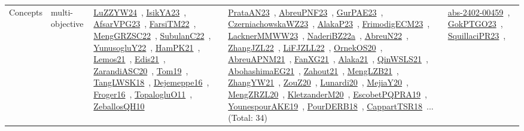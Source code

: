 {\begin{longtable}{lp{3cm}>{\raggedright\arraybackslash}p{6cm}>{\raggedright\arraybackslash}p{6cm}>{\raggedright\arraybackslash}p{8cm}}
\index{multi-objective}\index{Concepts!multi-objective}Concepts & multi-objective & \href{../works/LuZZYW24.pdf}{LuZZYW24}~\cite{LuZZYW24}, \href{../works/IsikYA23.pdf}{IsikYA23}~\cite{IsikYA23}, \href{../works/AfsarVPG23.pdf}{AfsarVPG23}~\cite{AfsarVPG23}, \href{../works/FarsiTM22.pdf}{FarsiTM22}~\cite{FarsiTM22}, \href{../works/MengGRZSC22.pdf}{MengGRZSC22}~\cite{MengGRZSC22}, \href{../works/SubulanC22.pdf}{SubulanC22}~\cite{SubulanC22}, \href{../works/YunusogluY22.pdf}{YunusogluY22}~\cite{YunusogluY22}, \href{../works/HamPK21.pdf}{HamPK21}~\cite{HamPK21}, \href{../works/Lemos21.pdf}{Lemos21}~\cite{Lemos21}, \href{../works/Edis21.pdf}{Edis21}~\cite{Edis21}, \href{../works/ZarandiASC20.pdf}{ZarandiASC20}~\cite{ZarandiASC20}, \href{../works/Tom19.pdf}{Tom19}~\cite{Tom19}, \href{../works/TangLWSK18.pdf}{TangLWSK18}~\cite{TangLWSK18}, \href{../works/Dejemeppe16.pdf}{Dejemeppe16}~\cite{Dejemeppe16}, \href{../works/Froger16.pdf}{Froger16}~\cite{Froger16}, \href{../works/TopalogluO11.pdf}{TopalogluO11}~\cite{TopalogluO11}, \href{../works/ZeballosQH10.pdf}{ZeballosQH10}~\cite{ZeballosQH10} & \href{../works/PrataAN23.pdf}{PrataAN23}~\cite{PrataAN23}, \href{../works/AbreuPNF23.pdf}{AbreuPNF23}~\cite{AbreuPNF23}, \href{../works/GurPAE23.pdf}{GurPAE23}~\cite{GurPAE23}, \href{../works/CzerniachowskaWZ23.pdf}{CzerniachowskaWZ23}~\cite{CzerniachowskaWZ23}, \href{../works/AlakaP23.pdf}{AlakaP23}~\cite{AlakaP23}, \href{../works/FrimodigECM23.pdf}{FrimodigECM23}~\cite{FrimodigECM23}, \href{../works/LacknerMMWW23.pdf}{LacknerMMWW23}~\cite{LacknerMMWW23}, \href{../works/NaderiBZ22a.pdf}{NaderiBZ22a}~\cite{NaderiBZ22a}, \href{../works/AbreuN22.pdf}{AbreuN22}~\cite{AbreuN22}, \href{../works/ZhangJZL22.pdf}{ZhangJZL22}~\cite{ZhangJZL22}, \href{../works/LiFJZLL22.pdf}{LiFJZLL22}~\cite{LiFJZLL22}, \href{../works/OrnekOS20.pdf}{OrnekOS20}~\cite{OrnekOS20}, \href{../works/AbreuAPNM21.pdf}{AbreuAPNM21}~\cite{AbreuAPNM21}, \href{../works/FanXG21.pdf}{FanXG21}~\cite{FanXG21}, \href{../works/Alaka21.pdf}{Alaka21}~\cite{Alaka21}, \href{../works/QinWSLS21.pdf}{QinWSLS21}~\cite{QinWSLS21}, \href{../works/AbohashimaEG21.pdf}{AbohashimaEG21}~\cite{AbohashimaEG21}, \href{../works/Zahout21.pdf}{Zahout21}~\cite{Zahout21}, \href{../works/MengLZB21.pdf}{MengLZB21}~\cite{MengLZB21}, \href{../works/ZhangYW21.pdf}{ZhangYW21}~\cite{ZhangYW21}, \href{../works/ZouZ20.pdf}{ZouZ20}~\cite{ZouZ20}, \href{../works/Lunardi20.pdf}{Lunardi20}~\cite{Lunardi20}, \href{../works/MejiaY20.pdf}{MejiaY20}~\cite{MejiaY20}, \href{../works/MengZRZL20.pdf}{MengZRZL20}~\cite{MengZRZL20}, \href{../works/KletzanderM20.pdf}{KletzanderM20}~\cite{KletzanderM20}, \href{../works/EscobetPQPRA19.pdf}{EscobetPQPRA19}~\cite{EscobetPQPRA19}, \href{../works/YounespourAKE19.pdf}{YounespourAKE19}~\cite{YounespourAKE19}, \href{../works/PourDERB18.pdf}{PourDERB18}~\cite{PourDERB18}, \href{../works/CappartTSR18.pdf}{CappartTSR18}~\cite{CappartTSR18}... (Total: 34) & \href{../works/abs-2402-00459.pdf}{abs-2402-00459}~\cite{abs-2402-00459}, \href{../works/GokPTGO23.pdf}{GokPTGO23}~\cite{GokPTGO23}, \href{../works/SquillaciPR23.pdf}{SquillaciPR23}~\cite{SquillaciPR23}, 
\end{longtable}}
